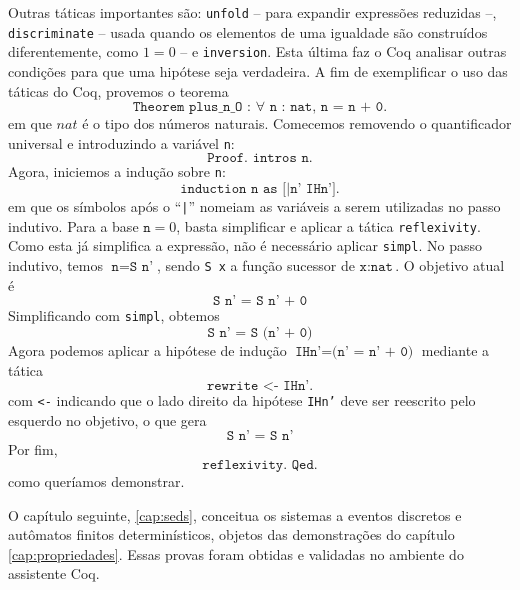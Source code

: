 Outras táticas importantes são: \texttt{unfold} -- para expandir expressões reduzidas --, \texttt{discriminate} -- usada quando os elementos de uma igualdade são construídos diferentemente, como $1 = 0$ -- e \texttt{inversion}. Esta última faz o Coq analisar outras condições para que uma hipótese seja verdadeira. A fim de exemplificar o uso das táticas do Coq, provemos o teorema $$\texttt{Theorem plus\_n\_O : $\forall$ n : nat, n = n + 0.}$$ em que $nat$ é o tipo dos números naturais. Comecemos removendo o quantificador universal e introduzindo a variável \texttt{n}: $$\texttt{Proof. intros n.}$$ Agora, iniciemos a indução sobre \texttt{n}: $$\texttt{induction n as [|n' IHn'].}$$ em que os símbolos após o ``\texttt{|}'' nomeiam as variáveis a serem utilizadas no passo indutivo. Para a base $\texttt{n} = 0$, basta simplificar e aplicar a tática \texttt{reflexivity}. Como esta já simplifica a expressão, não é necessário aplicar \texttt{simpl}. No passo indutivo, temos $\texttt{n} = \texttt{S n'}$, sendo \texttt{S x} a função sucessor de $\texttt{x} : \texttt{nat}$. O objetivo atual é $$\texttt{S n' = S n' + 0}$$ Simplificando com \texttt{simpl}, obtemos $$\texttt{S n' = S (n' + 0)}$$ Agora podemos aplicar a hipótese de indução $\texttt{IHn'} = \texttt{(n' = n' + 0)}$ mediante a tática $$\texttt{rewrite <- IHn'.}$$ com \texttt{<-} indicando que o lado direito da hipótese \texttt{IHn'} deve ser reescrito pelo esquerdo no objetivo, o que gera $$\texttt{S n' = S n'}$$ Por fim, $$\texttt{reflexivity. Qed.}$$ como queríamos demonstrar.

O capítulo seguinte, \ref{cap:seds}, conceitua os sistemas a eventos discretos e autômatos finitos determinísticos, objetos das demonstrações do capítulo \ref{cap:propriedades}. Essas provas foram obtidas e validadas no ambiente do assistente Coq.